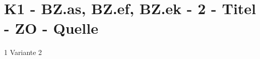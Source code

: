 \section{K1 - BZ.as, BZ.ef, BZ.ek - 2 - Titel - ZO - Quelle}

\begin{langesbeispiel}\item[1] %
Variante 2

\end{langesbeispiel}